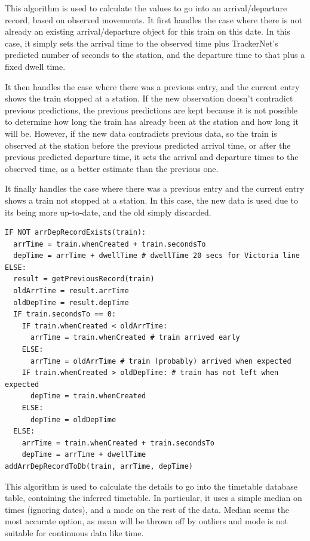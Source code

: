 \documentclass[a4paper,12pt,twoside]{report}
\begin{document}
This algorithm is used to calculate the values to go into an arrival/departure
record, based on observed movements. It first handles the case where there is
not already an existing arrival/departure object for this train on this date.
In this case, it simply sets the arrival time to the observed time plus
TrackerNet's predicted number of seconds to the station, and the departure time
to that plus a fixed dwell time.

It then handles the case where there was a previous entry, and the current
entry shows the train stopped at a station. If the new observation doesn't
contradict previous predictions, the previous predictions are kept because it
is not possible to determine how long the train has already been at the station
and how long it will be. However, if the new data contradicts previous data, so
the train is observed at the station before the previous predicted arrival
time, or after the previous predicted departure time, it sets the arrival and
departure times to the observed time, as a better estimate than the previous
one.

It finally handles the case where there was a previous entry and the current
entry shows a train not stopped at a station. In this case, the new data is
used due to its being more up-to-date, and the old simply discarded.

\begin{lstlisting}
IF NOT arrDepRecordExists(train):
  arrTime = train.whenCreated + train.secondsTo
  depTime = arrTime + dwellTime # dwellTime 20 secs for Victoria line
ELSE:
  result = getPreviousRecord(train)
  oldArrTime = result.arrTime
  oldDepTime = result.depTime
  IF train.secondsTo == 0:
    IF train.whenCreated < oldArrTime:
      arrTime = train.whenCreated # train arrived early
    ELSE:
      arrTime = oldArrTime # train (probably) arrived when expected
    IF train.whenCreated > oldDepTime: # train has not left when expected
      depTime = train.whenCreated
    ELSE:
      depTime = oldDepTime
  ELSE:
    arrTime = train.whenCreated + train.secondsTo
    depTime = arrTime + dwellTime
addArrDepRecordToDb(train, arrTime, depTime)
\end{lstlisting}

This algorithm is used to calculate the details to go into the timetable
database table, containing the inferred timetable. In particular, it uses a
simple median on times (ignoring dates), and a mode on the rest of the data.
Median seems the most accurate option, as mean will be thrown off by outliers
and mode is not suitable for continuous data like time.
\end{document}

